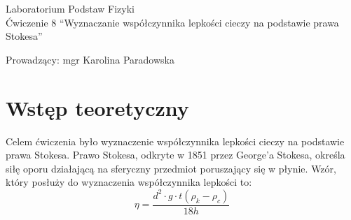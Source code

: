 \documentclass[polish, 11pt, a4paper]{article}
\begin{document}
	\begin{titlepage}
	\centering
	\Huge Laboratorium Podstaw Fizyki\\
	\vspace{1cm}
	\huge Ćwiczenie 8 \enquote{Wyznaczanie współczynnika lepkości cieczy na podstawie prawa Stokesa}\\
	\vspace{1cm}
	\raggedright
	\huge Prowadzący: mgr Karolina Paradowska\\
	\vspace{.5cm}
	\begin{table}[h]
		\centering
	\end{table}
	\end{titlepage}
	\section{Wstęp teoretyczny}
		\RaggedRight
		Celem ćwiczenia było wyznaczenie współczynnika lepkości cieczy na podstawie prawa Stokesa. Prawo Stokesa, odkryte w 1851 przez George'a Stokesa, określa siłę oporu działającą na sferyczny przedmiot poruszający się w płynie. Wzór, który posłuży do wyznaczenia współczynnika lepkości to:
		\begin{displaymath}
		\eta=\frac{d^2\cdot g\cdot t(\rho_k-\rho_c)}{18h}
		\end{displaymath}
		
\end{document}
